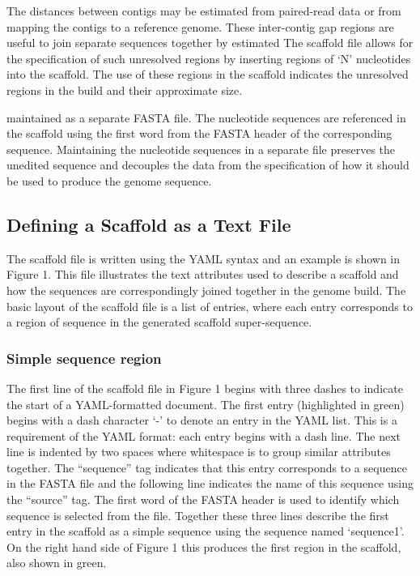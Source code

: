\documentclass[10pt]{bmc_article}
\newenvironment{bmcformat}{\begin{raggedright}\baselineskip20pt\sloppy\setboolean{publ}{false}}{\end{raggedright}\baselineskip20pt\sloppy}
\begin{document}
\begin{bmcformat}
The distances between contigs may be estimated from paired-read data or from
mapping the contigs to a reference genome. These inter-contig gap regions are
useful to join separate sequences together by  estimated
 The scaffold file allows for the specification
of such unresolved regions by inserting regions of `N' nucleotides into the
scaffold. The use of these regions in the scaffold indicates the unresolved
regions in the build and their approximate size. \pb


 maintained as
a separate FASTA file. The nucleotide sequences
 are referenced in the scaffold using the
first word from  the FASTA header of the corresponding sequence.
Maintaining the nucleotide sequences in a separate file preserves the unedited
sequence and decouples the data from the specification of how it should be
used to produce the genome sequence. \pb

\subsection*{Defining a Scaffold as a Text File} %

The scaffold file is written using the YAML syntax and an example is shown in
Figure 1. This file illustrates the text attributes used to describe
a scaffold and how the sequences are correspondingly joined together in the
genome build. The basic layout of the scaffold file is a list of entries,
where each entry corresponds to a region of sequence in the generated scaffold
super-sequence. \pb

\subsubsection*{Simple sequence region} %

The first line of the scaffold file in Figure 1 begins with three dashes to
indicate the start of a YAML-formatted document. The first entry (highlighted
in green) begins with a dash character `-' to denote an entry in the YAML
list. This is a requirement of the YAML format:  each entry
begins with a dash line. The next line is indented by two spaces where
whitespace is  to group similar attributes together.
The ``sequence'' tag indicates that this entry corresponds to a sequence in
the FASTA file and the following line indicates the name of this sequence
using the ``source'' tag. The first word of the FASTA header is used to
identify which sequence is selected from the file. Together these three lines
describe the first entry in the scaffold as a simple sequence using the
sequence named `sequence1'. On the right hand side of Figure 1 this produces
the first region in the scaffold, also shown in green. \pb


\end{bmcformat}
\end{document}
